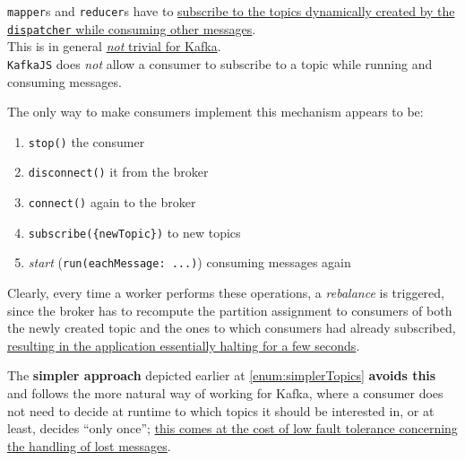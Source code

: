 \texttt{mapper}s and \texttt{reducer}s have to \ul{subscribe to the topics dynamically created by the \texttt{dispatcher} while consuming other messages}. \\
This is in general \ul{\textit{not} trivial for Kafka}.\\
\verb|KafkaJS| does \textit{not} allow a consumer to subscribe to a topic while running and consuming messages.

{The only way to make consumers implement this mechanism appears to be:\ns
\begin{enumerate}
   \item \verb|stop()| the consumer 
   \item \verb|disconnect()| it from the broker
   \item \verb|connect()| again to the broker
   \item \verb|subscribe({newTopic})| to new topics
   \item \textit{start} (\verb|run(eachMessage: ...)|) consuming messages again
\end{enumerate}}

Clearly, every time a worker performs these operations, a \textit{rebalance} is triggered, since the broker has to recompute the partition assignment to consumers of both the newly created topic and the ones to which consumers had already subscribed,
\ul{resulting in the application essentially halting for a few seconds}.

The \textbf{simpler approach} depicted earlier at \ref{enum:simplerTopics} \textbf{avoids this} and follows the more natural way of working for Kafka, where a consumer does not need to decide at runtime to which topics it should be interested in, or at least, decides ``only once'';
\ul{this comes at the cost of low fault tolerance concerning the handling of lost messages}.




